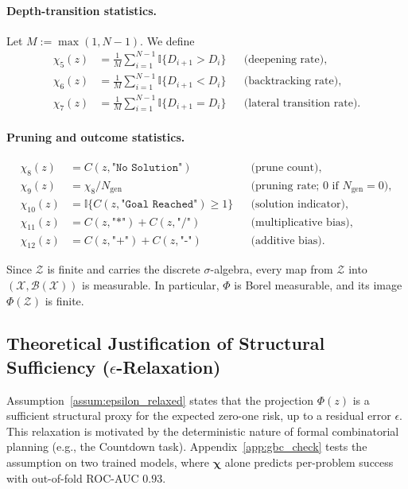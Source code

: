 \paragraph{Depth-transition statistics.}
Let $M := \max(1, N-1)$. We define
\begin{align}
\chi_5(z) &= \frac{1}{M}\sum_{i=1}^{N-1}\mathbb{I}\{D_{i+1} > D_i\}
&& \text{(deepening rate)}, \\
\chi_6(z) &= \frac{1}{M}\sum_{i=1}^{N-1}\mathbb{I}\{D_{i+1} < D_i\}
&& \text{(backtracking rate)}, \\
\chi_7(z) &= \frac{1}{M}\sum_{i=1}^{N-1}\mathbb{I}\{D_{i+1} = D_i\}
&& \text{(lateral transition rate)}.
\end{align}

\paragraph{Pruning and outcome statistics.}
\begin{align}
\chi_8(z) &= C(z,\texttt{"No Solution"})
&& \text{(prune count)}, \\
\chi_9(z) &= \chi_8/N_{\mathrm{gen}}
&& \text{(pruning rate; $0$ if $N_{\mathrm{gen}}=0$)}, \\
\chi_{10}(z) &= \mathbb{I}\{C(z,\texttt{"Goal Reached"}) \ge 1\}
&& \text{(solution indicator)}, \\
\chi_{11}(z) &= C(z,\texttt{"*"}) + C(z,\texttt{"/"})
&& \text{(multiplicative bias)}, \\
\chi_{12}(z) &= C(z,\texttt{"+"}) + C(z,\texttt{"-"})
&& \text{(additive bias)}.
\end{align}

Since $\mathcal{Z}$ is finite and carries the discrete $\sigma$-algebra, every map from $\mathcal{Z}$ into $(\mathcal{X},\mathcal{B}(\mathcal{X}))$ is measurable. In particular, $\Phi$ is Borel measurable, and its image $\Phi(\mathcal Z)$ is finite.

\subsection{Theoretical Justification of Structural Sufficiency (\texorpdfstring{$\epsilon$}{epsilon}-Relaxation)}
\label{app:empirical_sufficiency}

Assumption~\ref{assum:epsilon_relaxed} states that the projection $\Phi(z)$ is a sufficient structural proxy for the expected zero-one risk, up to a residual error $\epsilon$. This relaxation is motivated by the deterministic nature of formal combinatorial planning (e.g., the Countdown task). Appendix~\ref{app:gbc_check} tests the assumption on two trained models, where $\boldsymbol{\chi}$ alone predicts per-problem success with out-of-fold ROC-AUC $0.93$.

